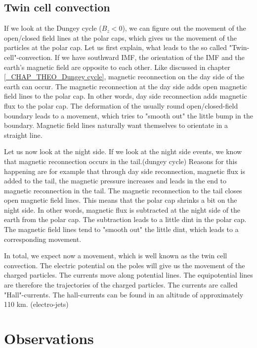 \documentclass[10pt,a4paper]{article}
\begin{document}
\subsection{Twin cell convection \label{_CHAP_THEO_twin cell convection}}
If we look at the Dungey cycle ($B_z<0$), we can figure out the movement of the open/closed field lines at the polar caps, which gives us the movement of the particles at the polar cap. 
Let us first explain, what leads to the so called "Twin-cell"-convection. If we have southward IMF, the orientation of the IMF and the earth's magnetic field are opposite to each other. Like discussed in chapter \ref{_CHAP_THEO_Dungey cycle}, magnetic reconnection on the day side of the earth can occur. The magnetic reconnection at the day side adds open magnetic field lines to the polar cap. In other words, day side reconnection adds magnetic flux to the polar cap. 
The deformation of the usually round open/closed-field boundary leads to a movement, which tries to "smooth out" the little bump in the boundary. Magnetic field lines naturally want themselves to orientate in a straight line. 

Let us now look at the night side. If we look at the night side events, we know that magnetic reconnection occurs in the tail.(dungey cycle) Reasons for this happening are for example that through day side reconnection, magnetic flux is added to the tail, the magnetic pressure increases and leads in the end to magnetic reconnection in the tail. 
The magnetic reconnection to the tail closes open magnetic field lines. This means that the polar cap shrinks a bit on the night side. In other words, magnetic flux is subtracted at the night side of the earth from the polar cap. The subtraction leads to a little dint in the polar cap. The magnetic field lines tend to "smooth out" the little dint, which leads to a corresponding movement. 

In total, we expect now a movement, which is well known as the twin cell convection. The electric potential on the poles will give us the movement of the charged particles. The currents move along potential lines. The equipotential lines are therefore the trajectories of the charged particles. The currents are called "Hall"-currents. The hall-currents can be found in an altitude of approximately 110 km. (electro-jets)


\section{Observations}
\end{document}
